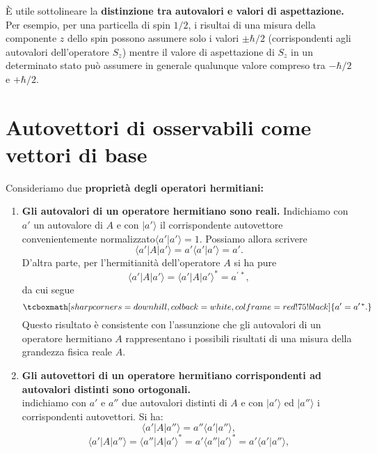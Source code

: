 È utile sottolineare la \textbf{distinzione tra autovalori e valori di aspettazione.} Per esempio, per una particella di spin $1/2$, i risultai di una misura della componente $z$ dello spin possono assumere solo i valori $\pm \hbar/2$ (corrispondenti agli autovalori dell'operatore $S_z$) mentre il valore di aspettazione di $S_z$ in un determinato stato può assumere in generale qualunque valore compreso tra $-\hbar /2$ e $+\hbar /2$.
\section{Autovettori di osservabili come vettori di base}
Consideriamo due \textbf{proprietà degli operatori hermitiani:}
\begin{enumerate}
\item \textbf{Gli autovalori di un operatore hermitiano sono reali.} Indichiamo con $a'$ un autovalore di $A$ e con $\vert a' \rangle $ il corrispondente autovettore convenientemente normalizzato$\langle a' \vert a' \rangle =1 $. Possiamo allora scrivere
	\begin{equation}
		\langle a' \vert A \vert a' \rangle = a' \langle a' \vert a' \rangle = a'.
	\end{equation}
D'altra parte, per l'hermitianità dell'operatore $A$ si ha pure
	\begin{equation}
		\langle a' \vert A \vert a' \rangle = \langle a' \vert A \vert a' \rangle  ^* = a^{\prime \, *},
	\end{equation}
da cui segue
	\begin{equation}
		\tcboxmath[sharp corners=downhill ,colback=white,colframe=red!75!black]{
			a'=a^{\prime \, *} .
			}
	\end{equation}
Questo risultato è consistente con l'assunzione che gli autovalori di un operatore hermitiano $A$ rappresentano i possibili risultati di una misura della grandezza fisica reale $A$.
\item \textbf{Gli autovettori di un operatore hermitiano corrispondenti ad autovalori distinti sono ortogonali.}\\
indichiamo con $a' $ e $a''$ due autovalori distinti di $A$ e con $\vert a' \rangle$ ed $\vert a'' \rangle$ i corrispondenti autovettori. Si ha:
	\begin{equation}
		\langle a' \vert A \vert a'' \rangle = a'' \langle a' \vert a'' \rangle ,
	\end{equation}
	\begin{equation}
		\langle a' \vert A \vert a'' \rangle = \langle a'' \vert A \vert a' \rangle ^* = a' \langle a'' \vert a' \rangle ^* = a' \langle a' \vert a'' \rangle ,

\end{equation}
\end{enumerate}

